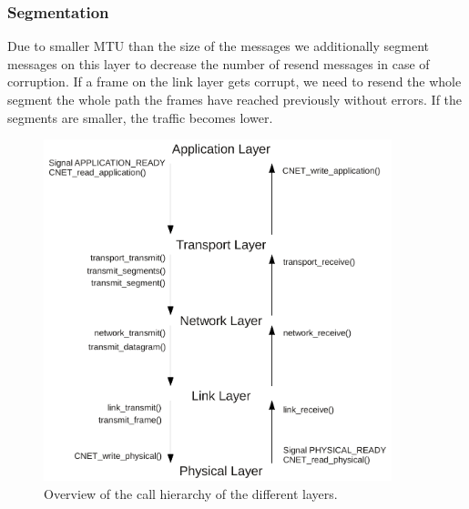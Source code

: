   \subsubsection{Segmentation}
  Due to smaller MTU than the size of the messages we additionally segment messages on this layer to decrease the number of resend messages in case of corruption. If a frame on the link layer gets corrupt, we need to resend the whole segment the whole path the frames have reached previously without errors. If the segments are smaller, the traffic becomes lower.

  \begin{figure}[p]
    \centering
    \includegraphics[width=0.9\textwidth]{images/flowgraph_overview.pdf}
    \caption[Overview Layers]{ Overview of the call hierarchy of the different layers.}
    \label{fig:overview-layers}
  \end{figure}

  \newpage

